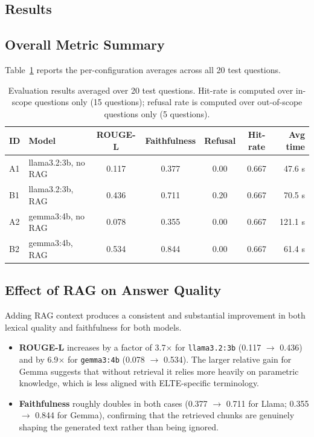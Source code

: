 \subsection{Results}
\label{sec:eval-results}

\subsection{Overall Metric Summary}

Table~\ref{tab:eval-summary} reports the per-configuration averages across all 20 test questions.

\begin{table}[H]
    \centering
    \begin{tabular}{|l|l|c|c|c|c|r|}
        \hline
        \textbf{ID} & \textbf{Model} & \textbf{ROUGE-L} & \textbf{Faithfulness} & \textbf{Refusal} & \textbf{Hit-rate} & \textbf{Avg time} \\
        \hline\hline
        A1 & llama3.2:3b, no RAG & 0.117 & 0.377 & 0.00 & 0.667 & 47.6 s \\
        B1 & llama3.2:3b, RAG    & 0.436 & 0.711 & 0.20 & 0.667 & 70.5 s \\
        A2 & gemma3:4b,   no RAG & 0.078 & 0.355 & 0.00 & 0.667 & 121.1 s \\
        B2 & gemma3:4b,   RAG    & 0.534 & 0.844 & 0.00 & 0.667 & 61.4 s \\
        \hline
    \end{tabular}
    \caption{Evaluation results averaged over 20 test questions. Hit-rate is computed over in-scope questions only (15 questions); refusal rate is computed over out-of-scope questions only (5 questions).}
    \label{tab:eval-summary}
\end{table}

\subsection{Effect of RAG on Answer Quality}

Adding RAG context produces a consistent and substantial improvement in both lexical quality and faithfulness for both models.

\begin{itemize}
    \item \textbf{ROUGE-L} increases by a factor of 3.7$\times$ for \texttt{llama3.2:3b} (0.117 $\to$ 0.436) and by 6.9$\times$ for \texttt{gemma3:4b} (0.078 $\to$ 0.534). The larger relative gain for Gemma suggests that without retrieval it relies more heavily on parametric knowledge, which is less aligned with ELTE-specific terminology.
    \item \textbf{Faithfulness} roughly doubles in both cases (0.377 $\to$ 0.711 for Llama; 0.355 $\to$ 0.844 for Gemma), confirming that the retrieved chunks are genuinely shaping the generated text rather than being ignored.
\end{itemize}

